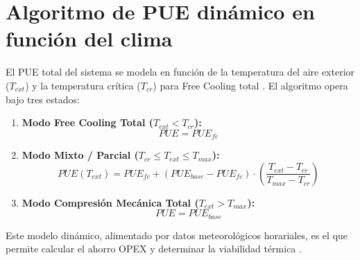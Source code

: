 \section{Algoritmo de PUE din\'amico en funci\'on del clima}\label{sec:algoritmo_pue}
El PUE total del sistema se modela en funci\'on de la temperatura del aire exterior ($T_{ext}$) y la temperatura cr\'itica ($T_{cr}$) para Free Cooling total \cite{greengrid2008}. El algoritmo opera bajo tres estados:
\begin{enumerate}
    \item \textbf{Modo Free Cooling Total ($T_{ext} < T_{cr}$):}
    \begin{equation}
    PUE = PUE_{fc}
    \end{equation}
    \item \textbf{Modo Mixto / Parcial ($T_{cr} \le T_{ext} \le T_{max}$):}
    \begin{equation}
    PUE(T_{ext}) = PUE_{fc} + (PUE_{base} - PUE_{fc}) \cdot \left( \frac{T_{ext} - T_{cr}}{T_{max} - T_{cr}} \right)
    \end{equation}
    \item \textbf{Modo Compresi\'on Mec\'anica Total ($T_{ext} > T_{max}$):}
    \begin{equation}
    PUE = PUE_{base}
    \end{equation}
\end{enumerate}
Este modelo din\'amico, alimentado por datos meteorol\'ogicos horariales, es el que permite calcular el ahorro OPEX y determinar la viabilidad t\'ermica \cite{greenberg2006}.
